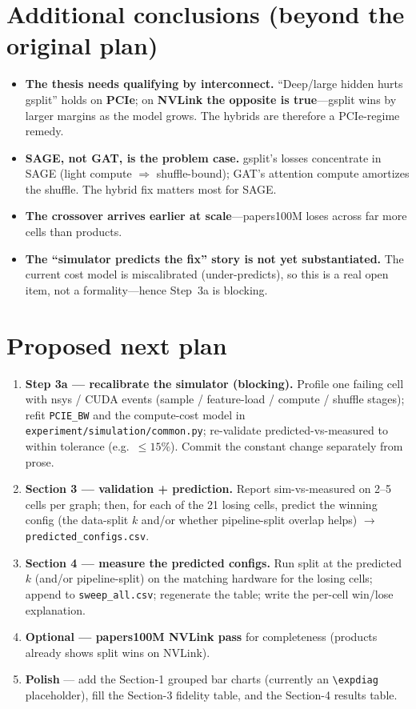 \section*{Additional conclusions (beyond the original plan)}
\begin{itemize}
\item \textbf{The thesis needs qualifying by interconnect.} ``Deep/large hidden hurts
gsplit'' holds on \textbf{PCIe}; on \textbf{NVLink the opposite is true}---gsplit wins by
larger margins as the model grows. The hybrids are therefore a PCIe-regime remedy.
\item \textbf{SAGE, not GAT, is the problem case.} gsplit's losses concentrate in SAGE
(light compute $\Rightarrow$ shuffle-bound); GAT's attention compute amortizes the
shuffle. The hybrid fix matters most for SAGE.
\item \textbf{The crossover arrives earlier at scale}---papers100M loses across far more
cells than products.
\item \textbf{The ``simulator predicts the fix'' story is not yet substantiated.} The
current cost model is miscalibrated (under-predicts), so this is a real open item, not a
formality---hence Step~3a is blocking.
\end{itemize}

\section*{Proposed next plan}
\begin{enumerate}
\item \textbf{Step 3a — recalibrate the simulator (blocking).} Profile one failing cell
with nsys / CUDA events (sample / feature-load / compute / shuffle stages); refit
\texttt{PCIE\_BW} and the compute-cost model in \texttt{experiment/simulation/common.py};
re-validate predicted-vs-measured to within tolerance (e.g.\ $\le 15\%$). Commit the
constant change separately from prose.
\item \textbf{Section 3 — validation + prediction.} Report sim-vs-measured on 2--5 cells
per graph; then, for each of the 21 losing cells, predict the winning config (the
data-split $k$ and/or whether pipeline-split overlap helps) $\rightarrow$
\texttt{predicted\_configs.csv}.
\item \textbf{Section 4 — measure the predicted configs.} Run split at the predicted $k$
(and/or pipeline-split) on the matching hardware for the losing cells; append to
\texttt{sweep\_all.csv}; regenerate the table; write the per-cell win/lose explanation.
\item \textbf{Optional — papers100M NVLink pass} for completeness (products already shows
split wins on NVLink).
\item \textbf{Polish} — add the Section-1 grouped bar charts (currently an
\texttt{\textbackslash expdiag} placeholder), fill the Section-3 fidelity table, and the
Section-4 results table.
\end{enumerate}

